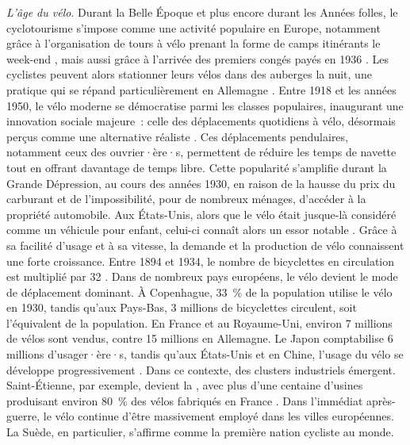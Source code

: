 \begin{refsegment}
\textsl{L'âge du vélo}. Durant la Belle Époque et plus encore durant les Années folles, le cyclotourisme s’impose comme une activité populaire en Europe, notamment grâce à l’organisation de tours à vélo prenant la forme de camps itinérants le week-end \textcolor{blue}{\autocite[26]{eskenazi_voir_2022}}, mais aussi grâce à l'arrivée des premiers congés payés en 1936 \textcolor{blue}{\autocite[108]{dauncey_french_2012}}. Les cyclistes peuvent alors stationner leurs vélos dans des auberges la nuit, une pratique qui se répand particulièrement en Allemagne \textcolor{blue}{\autocite[327]{herlihy_bicycle_2004}}. Entre 1918 et les années 1950, le vélo moderne se démocratise parmi les classes populaires, inaugurant une innovation sociale majeure~: celle des déplacements quotidiens à vélo, désormais perçus comme une alternative réaliste \textcolor{blue}{\autocite[31]{jouenne_quest-ce_2022}}. Ces déplacements pendulaires, notamment ceux des ouvrier·ère·s, permettent de réduire les temps de navette tout en offrant davantage de temps libre. Cette popularité s’amplifie durant la Grande Dépression, au cours des années 1930, en raison de la hausse du prix du carburant et de l’impossibilité, pour de nombreux ménages, d’accéder à la propriété automobile. Aux États-Unis, alors que le vélo était jusque-là considéré comme un véhicule pour enfant, celui-ci connaît alors un essor notable \textcolor{blue}{\autocite[327]{herlihy_bicycle_2004}}. Grâce à sa facilité d’usage et à sa vitesse, la demande et la production de vélo connaissent une forte croissance. Entre 1894 et 1934, le nombre de bicyclettes en circulation est multiplié par 32 \textcolor{blue}{\autocite[32]{papon_retour_2012}}. Dans de nombreux pays européens, le vélo devient le mode de déplacement dominant. À Copenhague, 33~\% de la population utilise le vélo en 1930, tandis qu’aux Pays-Bas, 3 millions de bicyclettes circulent, soit l’équivalent de la population. En France et au Royaume-Uni, environ 7 millions de vélos sont vendus, contre 15 millions en Allemagne. Le Japon comptabilise 6 millions d’usager·ère·s, tandis qu’aux États-Unis et en Chine, l’usage du vélo se développe progressivement \textcolor{blue}{\autocite[329]{herlihy_bicycle_2004}}. Dans ce contexte, des clusters industriels émergent. Saint-Étienne, par exemple, devient la , avec plus d’une centaine d’usines produisant environ 80~\% des vélos fabriqués en France \textcolor{blue}{\autocite[328]{herlihy_bicycle_2004}}. Dans l’immédiat après-guerre, le vélo continue d’être massivement employé dans les villes européennes. La Suède, en particulier, s’affirme comme la première nation cycliste au monde.%


\end{refsegment}
